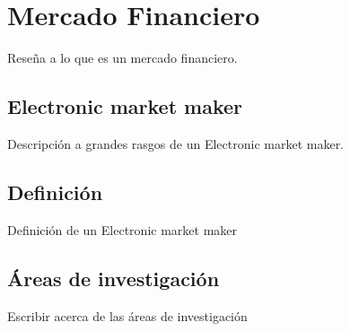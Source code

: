\section{Mercado Financiero}
Reseña a lo que es un mercado financiero.

\subsection{Electronic market maker}
Descripción a grandes rasgos de un Electronic market maker.

\subsection{Definición}
Definición de un Electronic market maker

\subsection{Áreas de investigación}
Escribir acerca de las áreas de investigación
